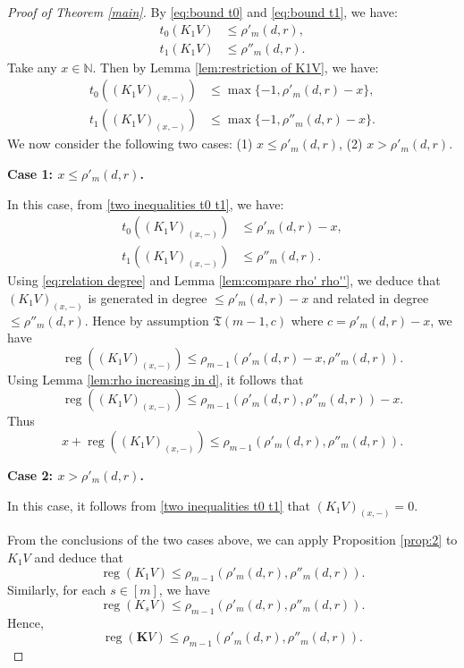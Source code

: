 \documentclass{amsart}
\numberwithin{equation}{section}
\DeclareMathOperator{\reg}{reg}
\newcommand{\N}{{\mathbb{N}}}
\begin{document}
\begin{proof}[Proof of Theorem \ref{main}]
   By \eqref{eq:bound t0} and \eqref{eq:bound t1}, we have: 
   \begin{align*}
      t_0(K_1 V) &\leqslant \rho'_m(d,r),\\
      t_1(K_1 V) &\leqslant \rho''_m(d,r).
   \end{align*} 
   Take any $x\in \N$. Then by Lemma \ref{lem:restriction of K1V}, we have: 
   \begin{equation}\label{two inequalities t0 t1}
   \begin{aligned} 
      t_0((K_1V)_{(x,-)}) &\leqslant \max\{ -1, \rho'_m(d,r)-x \}, \\
      t_1((K_1V)_{(x,-)}) &\leqslant \max\{ -1, \rho''_m(d,r)-x \}. 
   \end{aligned} \end{equation}
   We now consider the following two cases: (1) $x\leqslant \rho'_m(d,r)$, (2) $x>\rho'_m(d,r)$. 
   
   \medskip 

   {\bf Case 1: $x\leqslant \rho'_m(d,r)$.}

   In this case, from \eqref{two inequalities t0 t1}, we have: 
   \begin{align*}
      t_0((K_1V)_{(x,-)}) &\leqslant \rho'_m(d,r)-x, \\
      t_1((K_1V)_{(x,-)}) &\leqslant \rho''_m(d,r).
   \end{align*}
   Using \eqref{eq:relation degree} and Lemma \ref{lem:compare rho' rho''}, we deduce that $(K_1V)_{(x,-)}$ is generated in degree $\leqslant \rho'_m(d,r)-x$ and related in degree $\leqslant \rho''_m(d,r)$. Hence by assumption $\mathfrak{T}(m-1,c)$ where $c=\rho'_m(d,r)-x$, we have 
   \[ \reg((K_1V)_{(x,-)}) \leqslant \rho_{m-1}(\rho'_m(d,r)-x, \rho''_m(d,r)). \]
   Using Lemma \ref{lem:rho increasing in d}, it follows that
   \[ \reg((K_1V)_{(x,-)}) \leqslant \rho_{m-1}(\rho'_m(d,r), \rho''_m(d,r)) - x. \]
   Thus 
   \[ x + \reg((K_1V)_{(x,-)}) \leqslant \rho_{m-1}(\rho'_m(d,r), \rho''_m(d,r)). \]

   \medskip 


   {\bf Case 2: $x> \rho'_m(d,r)$.}

   In this case, it follows from \eqref{two inequalities t0 t1} that $(K_1V)_{(x,-)}=0$.

   \medskip 


   From the conclusions of the two cases above, we can apply Proposition \ref{prop:2} to $K_1V$ and deduce that 
   \[ \reg(K_1V) \leqslant \rho_{m-1}(\rho'_m(d,r), \rho''_m(d,r)). \]
   Similarly, for each $s\in [m]$, we have
   \[ \reg(K_sV) \leqslant \rho_{m-1}(\rho'_m(d,r), \rho''_m(d,r)). \]
   Hence,
   \begin{equation} \label{eq:bound reg of KV}
      \reg(\mathbf{K}V) \leqslant \rho_{m-1}(\rho'_m(d,r), \rho''_m(d,r)). 
   \end{equation}



\end{proof}
\end{document}
